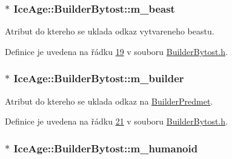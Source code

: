 \subsubsection[{\texorpdfstring{m\+\_\+beast}{m_beast}}]{$\ast$ Ice\+Age\+::\+Builder\+Bytost\+::m\+\_\+beast\hspace{0.3cm}{\ttfamily [private]}}\hypertarget{classIceAge_1_1BuilderBytost_a220df66c99fac9d382f5d1825f5295de}{}\label{classIceAge_1_1BuilderBytost_a220df66c99fac9d382f5d1825f5295de}


Atribut do ktereho se uklada odkaz vytvareneho beastu. 



Definice je uvedena na řádku \hyperlink{BuilderBytost_8h_source_l00019}{19} v souboru \hyperlink{BuilderBytost_8h_source}{Builder\+Bytost.\+h}.

\subsubsection[{\texorpdfstring{m\+\_\+builder}{m_builder}}]{$\ast$ Ice\+Age\+::\+Builder\+Bytost\+::m\+\_\+builder\hspace{0.3cm}{\ttfamily [private]}}\hypertarget{classIceAge_1_1BuilderBytost_a39f10b26bcda8142ce353e6ca761cabb}{}\label{classIceAge_1_1BuilderBytost_a39f10b26bcda8142ce353e6ca761cabb}


Atribut do ktereho se uklada odkaz na \hyperlink{classIceAge_1_1BuilderPredmet}{Builder\+Predmet}. 



Definice je uvedena na řádku \hyperlink{BuilderBytost_8h_source_l00021}{21} v souboru \hyperlink{BuilderBytost_8h_source}{Builder\+Bytost.\+h}.

\subsubsection[{\texorpdfstring{m\+\_\+humanoid}{m_humanoid}}]{$\ast$ Ice\+Age\+::\+Builder\+Bytost\+::m\+\_\+humanoid\hspace{0.3cm}{\ttfamily [private]}}\hypertarget{classIceAge_1_1BuilderBytost_a3f4076d50f5bf435c3a90fc123d807a2}{}\label{classIceAge_1_1BuilderBytost_a3f4076d50f5bf435c3a90fc123d807a2}


